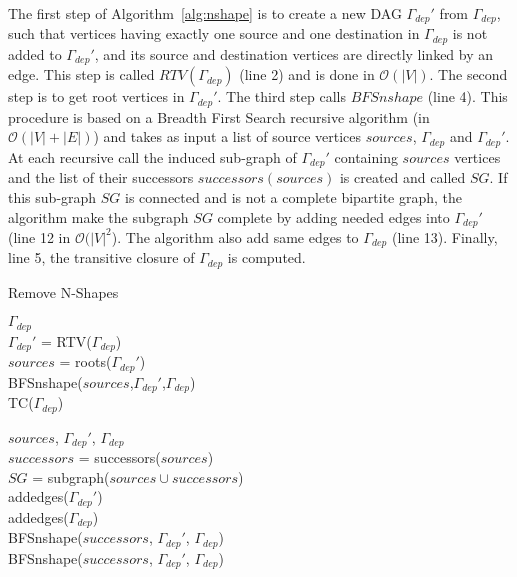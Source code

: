 The first step of Algorithm~\ref{alg:nshape} is to create a new DAG $\Gamma_{dep}'$ from $\Gamma_{dep}$, such that vertices having exactly one source and one destination in $\Gamma_{dep}$ is not added to $\Gamma_{dep}'$, and its source and destination vertices are directly linked by an edge. This step is called $RTV(\Gamma_{dep})$ (line 2) and is done in $\mathcal{O}(|V|)$. The second step is to get root vertices in $\Gamma_{dep}'$. The third step calls $BFSnshape$ (line 4). This procedure is based on a Breadth First Search recursive algorithm (in $\mathcal{O}(|V|+|E|)$) and takes as input a list of source vertices $sources$, $\Gamma_{dep}$ and $\Gamma_{dep}'$. At each recursive call the induced sub-graph of $\Gamma_{dep}'$ containing $sources$ vertices and the list of their successors $successors(sources)$ is created and called $SG$. If this sub-graph $SG$ is connected and is not a complete bipartite graph, the algorithm make the subgraph $SG$ complete by adding needed edges into $\Gamma_{dep}'$ (line 12 in $\mathcal{O}(|V|^2$). The algorithm also add same edges to $\Gamma_{dep}$ (line 13). Finally, line 5, the transitive closure of $\Gamma_{dep}$ is computed.

\begin{algorithm}
\caption{Remove N-Shapes}
\label{alg:nshape}
\begin{algorithmic}[1]
 {$\Gamma_{dep}$}
\\$\Gamma_{dep}'$ = RTV($\Gamma_{dep}$)
\\$sources$ = roots($\Gamma_{dep}'$)
\\BFSnshape($sources$,$\Gamma_{dep}'$,$\Gamma_{dep}$)
\\TC($\Gamma_{dep}$)
\EndProcedure

 {$sources$, $\Gamma_{dep}'$, $\Gamma_{dep}$}
\\$successors$ = successors($sources$)
\\$SG$ = subgraph($sources \cup successors$)
\\addedges($\Gamma_{dep}'$)
\\addedges($\Gamma_{dep}$)
\\BFSnshape($successors$, $\Gamma_{dep}'$, $\Gamma_{dep}$)
\EndIf
{}
\\BFSnshape($successors$, $\Gamma_{dep}'$, $\Gamma_{dep}$)
\EndIf
\EndIf
\EndProcedure
\end{algorithmic}
\end{algorithm}

